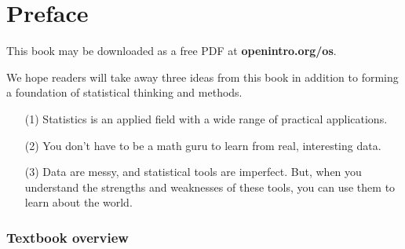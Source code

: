 \chapter*{Preface}

This book may be downloaded as a free PDF at
    {\color{black}\textbf{openintro.org/os}}. \vspace{3mm}

\noindent We hope readers will take away three ideas from
this book in addition to forming a foundation of statistical
thinking and methods.\vspace{-1mm}
\begin{enumerate}
\setlength{\itemsep}{0mm}
\item[(1)] Statistics is an applied field with a wide range
    of practical applications.
\item[(2)] You don't have to be a math guru to learn
    from real, interesting data.
\item[(3)] Data are messy, and statistical tools are imperfect.
    But, when you understand the strengths and weaknesses of
    these tools, you can use them to learn about the world.
\end{enumerate}


\subsection*{Textbook overview}

